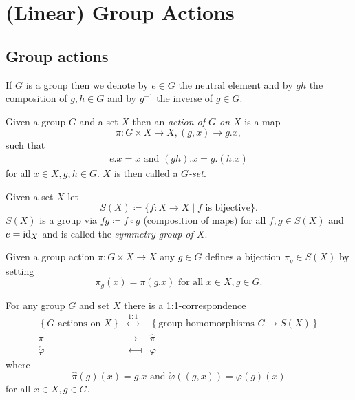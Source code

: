 \chapter{(Linear) Group Actions}





\section{Group actions}


If $G$ is a group then we denote by $e \in G$ the neutral element and by $gh$ the composition of $g,h \in G$ and by $g^{-1}$ the inverse of $g \in G$.


\begin{defi}
 Given a group $G$ and a set $X$ then an \emph{action of $G$ on $X$} is a map
 \[
  \pi \colon G \times X \to X, (g,x) \to g.x,
 \]
 such that
 \begin{gather*}
  e.x = x \text{ and }
  (gh).x = g.(h.x)
 \end{gather*}
 for all $x \in X, g,h \in G$. $X$ is then called a \emph{$G$-set}.
\end{defi}


\begin{defi}
 Given a set $X$ let
 \[
  S(X) \coloneqq \{f \colon X \to X \mid f \text{ is bijective}\}.
 \]
 $S(X)$ is a group via $fg \coloneqq f \circ g$ (composition of maps) for all $f,g \in S(X)$ and $e = \operatorname{id}_X$ and is called the \emph{symmetry group of $X$}.
\end{defi}


Given a group action $\pi \colon G \times X \to X$ any  $g \in G$ defines a bijection $\pi_g \in S(X)$ by setting
\[
 \pi_g(x) = \pi(g.x) \text{ for all } x \in X, g \in G.
\]


\begin{lem}\label{lem: G-actions = group homos G -> S(X)}
 For any group $G$ and set $X$ there is a 1:1-correspondence
 \[
 \begin{matrix}
    \left\{\text{$G$-actions on $X$}\right\}
  & \overset{1:1}{\longleftrightarrow}
  & \left\{\text{group homomorphisms $G \to S(X)$}\right\} \\
    \pi
  & \longmapsto
  & \hat{\pi} \\
    \mathring{\varphi}
  & \longmapsfrom
  & \varphi
  \end{matrix}
 \]
 where
 \[
  \hat{\pi}(g)(x) = g.x \text{ and } \mathring{\varphi}((g,x)) = \varphi(g)(x)
 \]
 for all $x \in X, g \in G$.
\end{lem}


